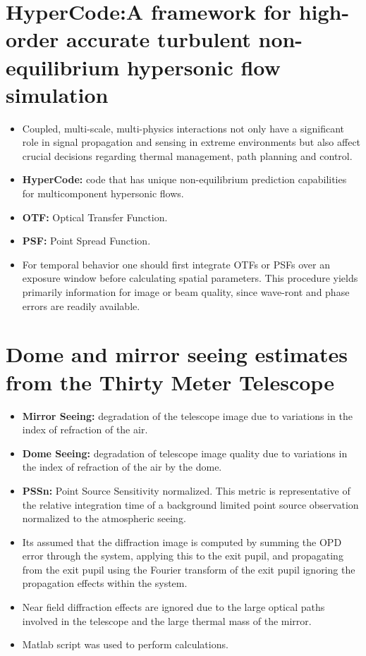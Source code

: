    \section{HyperCode:A framework for high-order accurate turbulent non-equilibrium hypersonic flow simulation \cite{vogiatzis:scitech:2020}} 
        \begin{itemize}
            \item Coupled, multi-scale, multi-physics interactions not only have a significant role in signal propagation and sensing in extreme environments but also affect crucial decisions regarding thermal management, path planning and control.
            \item \textbf{HyperCode:} code that has unique non-equilibrium prediction capabilities for multicomponent hypersonic flows.
            \item \textbf{OTF:} Optical Transfer Function.  
            \item \textbf{PSF:} Point Spread Function.
            \item For temporal behavior one should first integrate OTFs or PSFs over an exposure window before calculating spatial parameters. This procedure yields primarily information for image or beam quality, since wave-ront and phase errors are readily available.
        \end{itemize}
        

    \section{Dome and mirror seeing estimates from the Thirty Meter Telescope \cite{pazder:spie:2006}}
        \begin{itemize}
            \item \textbf{Mirror Seeing:} degradation of the telescope image due to variations in the index of refraction of the air. 
            \item \textbf{Dome Seeing:} degradation of telescope image quality due to variations in the index of refraction of the air by the dome. 
            \item \textbf{PSSn:} Point Source Sensitivity normalized. This metric is representative of the relative integration time of a background limited point source observation normalized to the atmospheric seeing.
            \item Its assumed that the diffraction image is computed by summing the OPD error through the system, applying this to the exit pupil, and propagating from the exit pupil using the Fourier transform of the exit pupil ignoring the propagation effects within the system. 
            \item Near field diffraction effects are ignored due to the large optical paths involved in the telescope and the large thermal mass of the mirror.
            \item Matlab script was used to perform calculations.
        \end{itemize}
    

